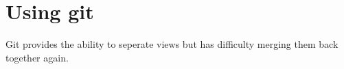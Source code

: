 
\chapter{Using git}
Git provides the ability to seperate views but has difficulty merging them back together again.  

% 

